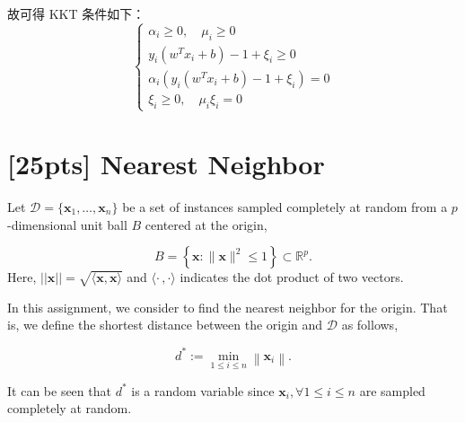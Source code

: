 \documentclass{article}
\begin{document}
	故可得 KKT 条件如下：
	\begin{equation}
		\begin{cases}
			\alpha_i \geq 0, \quad \mu_i \geq 0 \\
			y_i(w^Tx_i + b) - 1 + \xi_i \geq 0 \\
			\alpha_i (y_i(w^Tx_i + b) - 1 + \xi_i) = 0 \\
			\xi_i \geq 0, \quad \mu_i\xi_i = 0
		\end{cases}	
	\end{equation}


	\newpage

	
	\section{[25pts] {Nearest Neighbor}}
	
	Let $\mathcal{D} = \{\mathbf{x}_1, \dots, \mathbf{x}_n\}$ be a set of instances sampled completely at random from a $p$-dimensional unit ball $B$ centered at the origin,
	
\begin{equation}
B=\left\{\mathbf{x} :\|\mathbf{x}\|^{2} \leq 1\right\} \subset \mathbb{R}^{p}.
\end{equation}
Here, $||\mathbf{x}|| = \sqrt{\langle \mathbf{x}, \mathbf{x}\rangle}$ and $\langle \cdot \,, \cdot \rangle$ indicates the dot product of two vectors.
	
In this assignment, we consider to find the nearest neighbor for the origin. That is, we define the shortest distance between the origin and $\mathcal{D}$ as follows,

\begin{equation}
d^{*} :=\min _{1 \leq i \leq n}\left\|\mathbf{x}_{i}\right\|.
\end{equation}
	
It can be seen that $d^*$ is a random variable since $\mathbf{x}_i, \forall 1 \leq i \leq n$ are sampled completely at random.	
	
\end{document}
